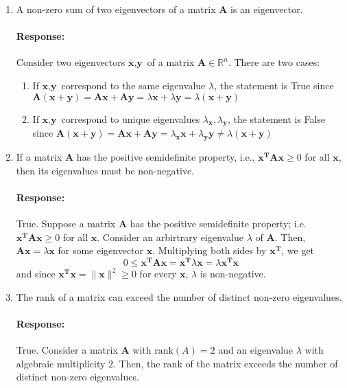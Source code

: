 \documentclass [11pt] {article}
\newcommand{\R}{\mathbb{R}}
\newcommand{\T}{\bf{T}}
\newcommand{\A}{\bf{A}}
\newcommand{\x}{\bf{x}}
\newenvironment{response}{\begin{responseframe}\vspace{-10pt}\paragraph{Response:}}{\end{responseframe}}
\renewcommand{\bf}[1]{\textbf{{#1}}}
\begin{document}
\begin{enumerate}
\begin{enumerate}
\begin{enumerate}[itemsep=10pt]
                    \item A non-zero sum of two eigenvectors of a matrix $\A$ is an eigenvector.
                        \begin{response}
                            Consider two eigenvectors $\bf{x}, \bf{y}$ of a matrix
                            $\A \in \R^n$. There are two cases:
                            \begin{enumerate}[label=\textit{Case \arabic*:},leftmargin=*]
                                \item If $\bf{x}, \bf{y}$ correspond to the same eigenvalue $\lambda$, 
                                    the statement is True since 
                                    $\A(\bf{x} + \bf{y}) = \A \bf{x} + \A \bf{y} = \lambda \bf{x} + \lambda \bf{y} = \lambda(\bf{x} + \bf{y})$
                                \item If $\bf{x}, \bf{y}$ correspond to unique eigenvalues 
                                    $\lambda_{\bf{x}}, \lambda_{\bf{y}}$, the statement is False since
                                    $\A(\bf{x} + \bf{y}) = \A \bf{x} + \A \bf{y} = \lambda_{\bf{x}} \bf{x} + \lambda_{\bf{y}} \bf{y} \neq \lambda(\bf{x} + \bf{y})$
                            \end{enumerate}
                        \end{response}

                    \item If a matrix $\A$ has the positive semidefinite property, i.e., 
                        $\x^{\T} \A \x \geq 0$ for all $\x$, then its eigenvalues must be
                        non-negative.
                        \begin{response}
                            True. Suppose a matrix $\A$ has the positive semidefinite
                            property; i.e. $\x^{\T} \A \x \geq 0$ for all $\x$. Consider an arbirtrary
                            eigenvalue $\lambda$ of $\A$. Then, $\A \x = \lambda \x$ for some eigenvector
                            $\x$. Multiplying both sides by $\x^{\T}$, we get 
                            \[0 \leq \x^{\T} \A \x = \x^{\T} \lambda \x = \lambda \x^{\T} \x\]
                            and since $\x^{\T} \x = \|\x\|^2 \geq 0$ for every $\x$, $\lambda$ is non-negative.
                        \end{response}

                    \item The rank of a matrix can exceed the number of distinct non-zero 
                        eigenvalues.
                        \begin{response}
                            True. Consider a matrix $\A$ with $\text{rank}(A) = 2$ and 
                            an eigenvalue $\lambda$ with algebraic multiplicity $2$. Then, the rank of
                            the matrix exceeds the number of distinct non-zero eigenvalues.
                        \end{response}


\end{enumerate}
\end{enumerate}
\end{enumerate}
\end{document}
